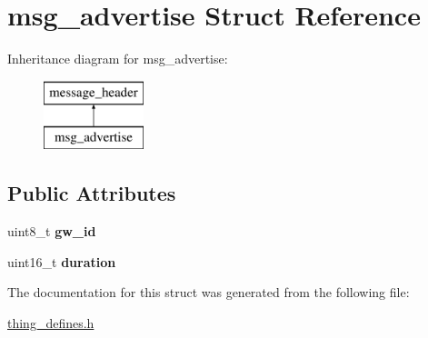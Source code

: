 \hypertarget{structmsg__advertise}{\section{msg\-\_\-advertise Struct Reference}
\label{structmsg__advertise}
}
Inheritance diagram for msg\-\_\-advertise\-:\begin{figure}[H]
\begin{center}
\leavevmode
\includegraphics[height=2.000000cm]{structmsg__advertise}
\end{center}
\end{figure}
\subsection*{Public Attributes}
\begin{DoxyCompactItemize}
\item 
\hypertarget{structmsg__advertise_a7bc4dcaae7dbd6d72f2a262259ee83c6}{uint8\-\_\-t {\bfseries gw\-\_\-id}}\label{structmsg__advertise_a7bc4dcaae7dbd6d72f2a262259ee83c6}

\item 
\hypertarget{structmsg__advertise_ae3abc7389105209dfec94092ff837128}{uint16\-\_\-t {\bfseries duration}}\label{structmsg__advertise_ae3abc7389105209dfec94092ff837128}

\end{DoxyCompactItemize}


The documentation for this struct was generated from the following file\-:\begin{DoxyCompactItemize}
\item 
\hyperlink{thing__defines_8h}{thing\-\_\-defines.\-h}\end{DoxyCompactItemize}
